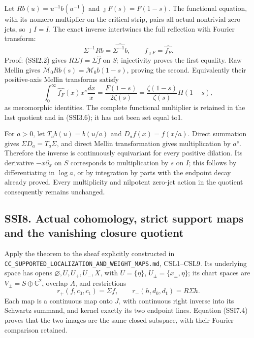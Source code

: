Let \(Rb(u)=u^{-1}b(u^{-1})\) and \(\jmath F(s)=F(1-s)\). The functional
equation, with its nonzero multiplier on the critical strip, pairs all
actual nontrivial-zero jets, so \(\jmath I=I\). The exact inverse
intertwines the full reflection with Fourier transform: \[
\Sigma^{-1}Rb=\widehat{\Sigma^{-1}b},\qquad
f_{\jmath F}=\widehat{f_F}.
\tag{SSI7.4}
\] Proof: (SSI2.2) gives \(R\Sigma f=\Sigma\widehat f\) on \(S\);
injectivity proves the first equality. Raw Mellin gives
\(\mathcal M_0Rb(s)=\mathcal M_0b(1-s)\), proving the second.
Equivalently their positive-axis Mellin transforms satisfy \[
\int_0^\infty\widehat{f_F}(x)x^s\frac{dx}{x}
=\frac{F(1-s)}{2\zeta(s)}
=\frac{\zeta(1-s)}{\zeta(s)}H(1-s),
\tag{SSI7.5}
\] as meromorphic identities. The complete functional multiplier is
retained in the last quotient and in (SSI3.6); it has not been set equal
to1.

For \(a>0\), let \(T_ab(u)=b(u/a)\) and \(D_af(x)=f(x/a)\). Direct
summation gives \(\Sigma D_a=T_a\Sigma\), and direct Mellin
transformation gives multiplication by \(a^s\). Therefore the inverse is
continuously equivariant for every positive dilation. Its derivative
\(-x\partial_x\) on \(S\) corresponds to multiplication by \(s\) on
\(I\); this follows by differentiating in \(\log a\), or by integration
by parts with the endpoint decay already proved. Every multiplicity and
nilpotent zero-jet action in the quotient consequently remains
unchanged.

\subsection{SSI8. Actual cohomology, strict support maps and the
vanishing closure
quotient}\label{ssi8.-actual-cohomology-strict-support-maps-and-the-vanishing-closure-quotient}

Apply the theorem to the sheaf explicitly constructed in
\nolinkurl{CC_SUPPORTED_LOCALIZATION_AND_WEIGHT_MAPS.md}, CSL1--CSL9.
Its underlying space has opens \(\varnothing,U,U_+,U_-,X\), with
\(U=\{\eta\}\), \(U_\pm=\{x_\pm,\eta\}\); its chart spaces are
\(V_\pm=S\oplus\mathbb C^2\), overlap \(A\), and restrictions \[
r_+(f,c_0,c_1)=\Sigma f,\qquad
r_-(h,d_0,d_1)=R\Sigma h.
\tag{SSI8.1}
\] Each map is a continuous map onto \(J\), with continuous right
inverse into its Schwartz summand, and kernel exactly its two endpoint
lines. Equation (SSI7.4) proves that the two images are the same closed
subspace, with their Fourier comparison retained.

